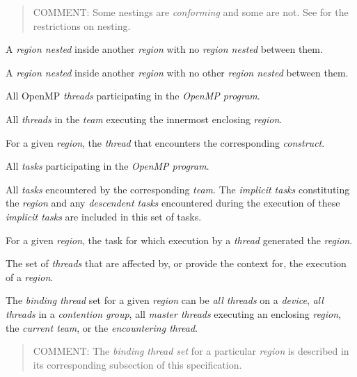 \begin{quote}
COMMENT: Some nestings are \emph{conforming} and some are not.
See  for the restrictions on nesting.
\end{quote}
\glossarydefend

\glossarydefstart
A \emph{region nested} inside another \emph{region} with no  \emph{region nested} between
them.
\glossarydefend

\glossarydefstart
A \emph{region nested} inside another \emph{region} with no other \emph{region nested} between
them.
\glossarydefend

\glossarydefstart
All OpenMP \emph{threads} participating in the \emph{OpenMP program}.
\glossarydefend

\glossarydefstart
All \emph{threads} in the \emph{team} executing the innermost enclosing  \emph{region}.
\glossarydefend

\glossarydefstart
For a given \emph{region}, the \emph{thread} that encounters the
corresponding \emph{construct}.
\glossarydefend

\glossarydefstart
All \emph{tasks} participating in the \emph{OpenMP program}.
\glossarydefend

\glossarydefstart
All \emph{tasks} encountered by the corresponding \emph{team}. The \emph{implicit tasks}
constituting the  \emph{region} and any \emph{descendent tasks} encountered during
the execution of these \emph{implicit tasks} are included in this set of tasks.
\glossarydefend

\glossarydefstart
For a given \emph{region}, the task for which execution by a \emph{thread} generated the \emph{region}.
\glossarydefend

\glossarydefstart
The set of \emph{threads} that are affected by, or provide the context for, the execution of
a \emph{region}.

The \emph{binding thread} set for a given \emph{region} can be \emph{all threads} on a \emph{device}, \emph{all
threads} in a \emph{contention group}, all \emph{master threads} executing an
enclosing  \emph{region}, the \emph{current team}, or the \emph{encountering thread}.

\begin{quote}
COMMENT: The \emph{binding thread set} for a particular \emph{region} is described in its
corresponding subsection of this specification.
\end{quote}
\glossarydefend

